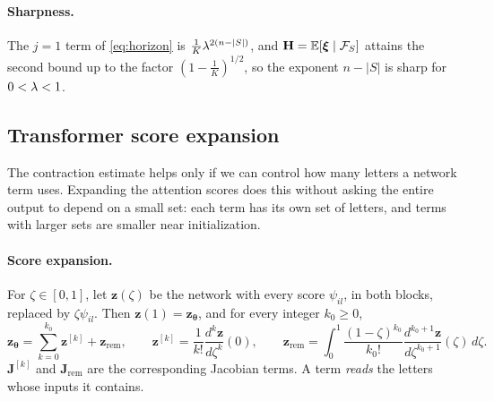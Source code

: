 \paragraph{Sharpness.}\label{rem:tight} The $j=1$ term of \cref{eq:horizon} is $\frac{1}{K}\lambda^{2(n-|S|)}$, and $\mathbf H=\mathbb E[\bm\xi\mid\mathcal F_S]$ attains the second bound up to the
factor $(1-\frac{1}{K})^{1/2}$, so the exponent $n-|S|$ is sharp for $0<\lambda<1$.

\subsection{Transformer score expansion}
\label{app:model-spectrum}

The contraction estimate helps only if we can control how many letters a network term uses. Expanding the attention scores does
this without asking the entire output to depend on a small set: each term has its own set of letters, and terms with larger sets
are smaller near initialization.

\paragraph{Score expansion.} For $\zeta\in[0,1]$, let $\bm z(\zeta)$ be the network with every score $\psi_{il}$, in both blocks, replaced by
$\zeta\psi_{il}$. Then $\bm z(1)=\bm z_{\bm\theta}$, and for every integer $k_0\ge0$,
\begin{equation}
 \bm z_{\bm\theta}=\sum_{k=0}^{k_0}\bm z^{[k]}+\bm z_{\mathrm{rem}},\qquad
 \bm z^{[k]}=\frac{1}{k!}\frac{d^k\bm z}{d\zeta^k}(0),\qquad
 \bm z_{\mathrm{rem}}=\int_0^1\frac{(1-\zeta)^{k_0}}{k_0!}\frac{d^{k_0+1}\bm z}{d\zeta^{k_0+1}}(\zeta)\,d\zeta .
 \label{eq:score-split}
\end{equation}
$\mathbf J^{[k]}$ and $\mathbf J_{\mathrm{rem}}$ are the corresponding Jacobian terms. A term \emph{reads} the letters whose inputs it contains.

